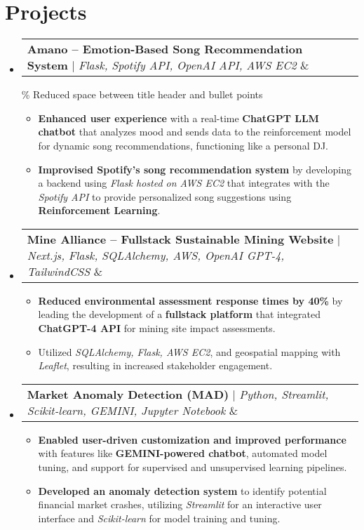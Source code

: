 \documentclass[letterpaper,10pt]{article}
\makeatletter
\newcommand{\resumeItem}[1]{
  \item\small{
    {#1 \vspace{-2pt}}
  }
}
\newcommand{\resumeProjectHeading}[2]{
    \item
    \begin{tabular*}{0.97\textwidth}{l@{\extracolsep{\fill}}r}
      \small#1 \& #2 \\
    \end{tabular*}\vspace{-2pt}
}
\newcommand{\resumeSubHeadingListStart}{\begin{itemize}[leftmargin=0.15in, label={}]}
\newcommand{\resumeSubHeadingListEnd}{\end{itemize}}
\newcommand{\resumeItemListStart}{\begin{itemize}}
\newcommand{\resumeItemListEnd}{\end{itemize}\vspace{-5pt}}
\makeatother
\begin{document}
\section{Projects}
    \vspace{-4pt}
    \resumeSubHeadingListStart
      \resumeProjectHeading
          {\textbf{Amano – Emotion-Based Song Recommendation System} $|$ \emph{Flask, Spotify API, OpenAI API, AWS EC2}}{}
      \vspace{-4pt} \% Reduced space between title header and bullet points
          \resumeItemListStart
            \resumeItem{\textbf{Enhanced user experience} with a real-time \textbf{ChatGPT LLM chatbot} that analyzes mood and sends data to the reinforcement model for dynamic song recommendations, functioning like a personal DJ.}
            \resumeItem{\textbf{Improvised Spotify's song recommendation system} by developing a backend using \emph{Flask hosted on AWS EC2} that integrates with the \emph{Spotify API} to provide personalized song suggestions using \textbf{Reinforcement Learning}.}
          \resumeItemListEnd

      \resumeProjectHeading
          {\textbf{Mine Alliance – Fullstack Sustainable Mining Website} $|$ \emph{Next.js, Flask, SQLAlchemy, AWS, OpenAI GPT-4, TailwindCSS}}{}
      \vspace{-4pt}
          \resumeItemListStart
            \resumeItem{\textbf{Reduced environmental assessment response times by 40\%} by leading the development of a \textbf{fullstack platform} that integrated \textbf{ChatGPT-4 API} for mining site impact assessments.}
            \resumeItem{Utilized \emph{SQLAlchemy, Flask, AWS EC2}, and geospatial mapping with \emph{Leaflet}, resulting in increased stakeholder engagement.}
          \resumeItemListEnd

      \resumeProjectHeading
          {\textbf{Market Anomaly Detection (MAD)} $|$ \emph{Python, Streamlit, Scikit-learn, GEMINI, Jupyter Notebook}}{}
      \vspace{-4pt}
          \resumeItemListStart
            \resumeItem{\textbf{Enabled user-driven customization and improved performance} with features like \textbf{GEMINI-powered chatbot}, automated model tuning, and support for supervised and unsupervised learning pipelines.}
            \resumeItem{\textbf{Developed an anomaly detection system} to identify potential financial market crashes, utilizing \emph{Streamlit} for an interactive user interface and \emph{Scikit-learn} for model training and tuning.}
          \resumeItemListEnd
    \resumeSubHeadingListEnd
\end{document}
